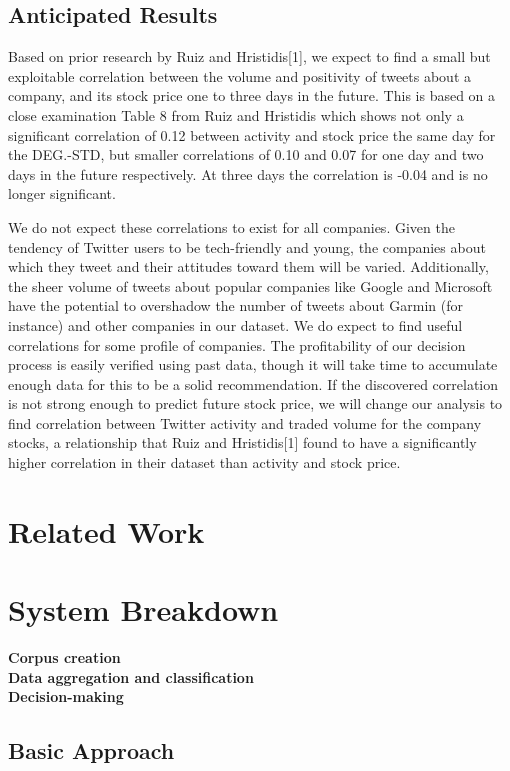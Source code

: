 \documentclass[letterpaper]{article}
\begin{document}
\subsection{Anticipated Results}
Based on prior research by Ruiz and Hristidis[1], we expect to find a small but exploitable correlation between the volume and positivity of tweets about a company, and its stock price one to three days in the future. This is based on a close examination Table 8 from Ruiz and Hristidis which shows not only a significant correlation of 0.12 between activity and stock price the same day for the DEG.-STD, but smaller correlations of 0.10 and 0.07 for one day and two days in the future respectively. At three days the correlation is -0.04 and is no longer significant.

We do not expect these correlations to exist for all companies. Given the tendency of Twitter users to be tech-friendly and young, the companies about which they tweet and their attitudes toward them will be varied. Additionally, the sheer volume of tweets about popular companies like Google and Microsoft have the potential to overshadow the number of tweets about Garmin (for instance) and other companies in our dataset. We do expect to find useful correlations for some profile of companies. The profitability of our decision process is easily verified using past data, though it will take time to accumulate enough data for this to be a solid recommendation. If the discovered correlation is not strong enough to predict future stock price, we will change our analysis to find correlation between Twitter activity and traded volume for the company stocks, a relationship that Ruiz and Hristidis[1] found to have a significantly higher correlation in their dataset than activity and stock price.

\section{Related Work}

\section{System Breakdown}
\textbf{Corpus creation}\\
\textbf{Data aggregation and classification}\\
\textbf{Decision-making}\\


\subsection{Basic Approach}
\end{document}
